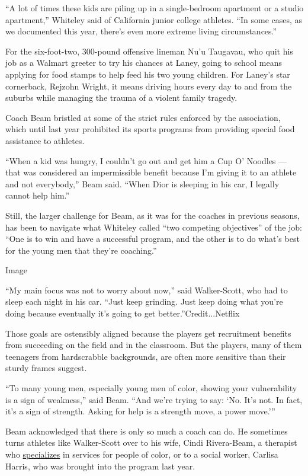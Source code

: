 ``A lot of times these kids are piling up in a single-bedroom apartment
or a studio apartment,'' Whiteley said of California junior college
athletes. ``In some cases, as we documented this year, there's even more
extreme living circumstances.''

For the six-foot-two, 300-pound offensive lineman Nu'u Taugavau, who
quit his job as a Walmart greeter to try his chances at Laney, going to
school means applying for food stamps to help feed his two young
children. For Laney's star cornerback, Rejzohn Wright, it means driving
hours every day to and from the suburbs while managing the trauma of a
violent family tragedy.

Coach Beam bristled at some of the strict rules enforced by the
association, which until last year prohibited its sports programs from
providing special food assistance to athletes.

``When a kid was hungry, I couldn't go out and get him a Cup O' Noodles
--- that was considered an impermissible benefit because I'm giving it
to an athlete and not everybody,'' Beam said. ``When Dior is sleeping in
his car, I legally cannot help him.''

Still, the larger challenge for Beam, as it was for the coaches in
previous seasons, has been to navigate what Whiteley called ``two
competing objectives'' of the job: ``One is to win and have a successful
program, and the other is to do what's best for the young men that
they're coaching.''

Image

``My main focus was not to worry about now,'' said Walker-Scott, who had
to sleep each night in his car. ``Just keep grinding. Just keep doing
what you're doing because eventually it's going to get
better.''Credit...Netflix

Those goals are ostensibly aligned because the players get recruitment
benefits from succeeding on the field and in the classroom. But the
players, many of them teenagers from hardscrabble backgrounds, are often
more sensitive than their sturdy frames suggest.

``To many young men, especially young men of color, showing your
vulnerability is a sign of weakness,'' said Beam. ``And we're trying to
say: `No. It's not. In fact, it's a sign of strength. Asking for help is
a strength move, a power move.'''

Beam acknowledged that there is only so much a coach can do. He
sometimes turns athletes like Walker-Scott over to his wife, Cindi
Rivera-Beam, a therapist who
\href{https://cindiriveratherapy.com}{specializes} in services for
people of color, or to a social worker, Carlisa Harris, who was brought
into the program last year.

